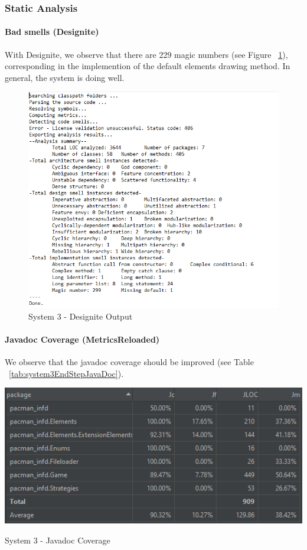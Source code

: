 \documentclass[]{article}
\begin{document}
\subsubsection{Static Analysis}

\paragraph{Bad smells (Designite)} 
With Designite, we observe that there are 229 magic numbers (see Figure ~\ref{fig:system3EndStepDesignite}), corresponding in the implemention of the default elements drawing method. In general, the system is doing well. 

\begin{figure}
\centering
    \includegraphics[width=\linewidth]{imgs/system3LastStepDesignite.PNG}
    \caption{System 3 - Designite Output}
    \label{fig:system3EndStepDesignite}
\end{figure}

\paragraph{Javadoc Coverage (MetricsReloaded)}
We observe that the javadoc coverage should be improved (see Table ~\ref{tab:system3EndStepJavaDoc}).

\begin{table}
\centering
    \includegraphics[width=\linewidth]{imgs/JavaDocCoverageS3.PNG}
    \caption{System 3 - Javadoc Coverage}
    \label{tab:system3EndStepJavaDoc}
\end{table}
\end{document}
